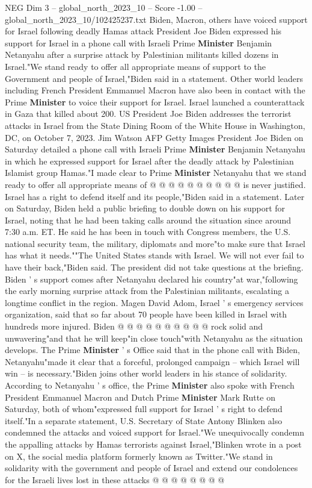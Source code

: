 \begin{textsample}{NEG Dim 3 – global\_north\_2023\_10 – Score -1.00 – global\_north\_2023\_10/102425237.txt}  \label{ex:f3_neg_259}
Biden, Macron, others have voiced support for Israel following deadly Hamas attack President Joe Biden expressed his support for Israel in a phone call with Israeli Prime \textbf{Minister} Benjamin Netanyahu after a surprise attack by Palestinian militants killed dozens in Israel."We stand ready to offer all appropriate means of support to the Government and people of Israel,"Biden said in a statement.
Other world leaders including French President Emmanuel Macron have also been in contact with the Prime \textbf{Minister} to voice their support for Israel.
Israel launched a counterattack in Gaza that killed about 200.
US President Joe Biden addresses the terrorist attacks in Israel from the State Dining Room of the White House in Washington, DC, on October 7, 2023.
Jim Watson AFP Getty Images President Joe Biden on Saturday detailed a phone call with Israeli Prime \textbf{Minister} Benjamin Netanyahu in which he expressed support for Israel after the deadly attack by Palestinian Islamist group Hamas."I made clear to Prime \textbf{Minister} Netanyahu that we stand ready to offer all appropriate means of @ @ @ @ @ @ @ @ @ @ is never justified.
Israel has a right to defend itself and its people,"Biden said in a statement.
Later on Saturday, Biden held a public briefing to double down on his support for Israel, noting that he had been taking calls around the situation since around 7:30 a.m.
ET.
He said he has been in touch with Congress members, the U.S. national security team, the military, diplomats and more"to make sure that Israel has what it needs.""The United States stands with Israel.
We will not ever fail to have their back,"Biden said.
The president did not take questions at the briefing.
Biden ' s support comes after Netanyahu declared his country"at war,"following the early morning surprise attack from the Palestinian militants, escalating a longtime conflict in the region.
Magen David Adom, Israel ' s emergency services organization, said that so far about 70 people have been killed in Israel with hundreds more injured.
Biden @ @ @ @ @ @ @ @ @ @ rock solid and unwavering"and that he will keep"in close touch"with Netanyahu as the situation develops.
The Prime \textbf{Minister} ' s Office said that in the phone call with Biden, Netanyahu"made it clear that a forceful, prolonged campaign -- which Israel will win -- is necessary."Biden joins other world leaders in his stance of solidarity.
According to Netanyahu ' s office, the Prime \textbf{Minister} also spoke with French President Emmanuel Macron and Dutch Prime \textbf{Minister} Mark Rutte on Saturday, both of whom"expressed full support for Israel ' s right to defend itself."In a separate statement, U.S.
Secretary of State Antony Blinken also condemned the attacks and voiced support for Israel."We unequivocally condemn the appalling attacks by Hamas terrorists against Israel,"Blinken wrote in a post on X, the social media platform formerly known as Twitter."We stand in solidarity with the government and people of Israel and extend our condolences for the Israeli lives lost in these attacks @ @ @ @ @ @ @ @

\end{textsample}
